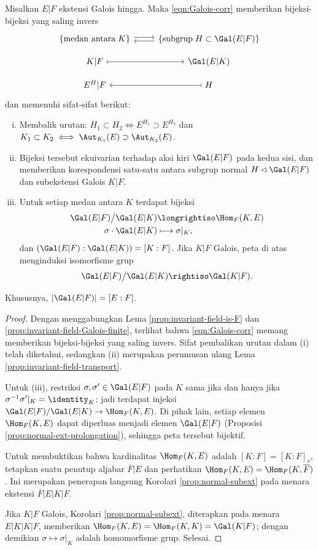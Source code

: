 \begin{theorem}\label{prop:finite-Galois-corr}
	Misalkan $E|F$ ekstensi Galois hingga. Maka \eqref{eqn:Galois-corr} memberikan bijeksi-bijeksi yang saling invers
	\[ \begin{tikzcd}[row sep=small]
	\left\{ \text{medan antara}\; K  \right\} \arrow[yshift=0.5ex, r] & \left\{\text{subgrup}\; H \subset \Gal(E|F) \right\} \arrow[yshift=-0.5ex, l] \\
		K|F \arrow[r, mapsto] & \Gal(E|K) \\
		E^H|F & H \arrow[l, mapsto]
	\end{tikzcd}\]
	dan memenuhi sifat-sifat berikut:
	\begin{enumerate}[(i)]
		\item Membalik urutan: $H_1\subset H_2\iff E^{H_1}\supset E^{H_2}$ dan $K_1\subset K_2\iff\Aut_{K_1}(E)\supset\Aut_{K_2}(E)$.
		\item Bijeksi tersebut ekuivarian terhadap aksi kiri $\Gal(E|F)$ pada kedua sisi, dan memberikan korespondensi satu-satu antara subgrup normal $H\lhd\Gal(E|F)$ dan subekstensi Galois $K|F$.
		\item Untuk setiap medan antara $K$ terdapat bijeksi
			\begin{align*}
				\Gal(E|F)\big/ \Gal(E|K) & \longrightiso \Hom_F(K, E) \\
				\sigma \cdot \Gal(E|K) & \longmapsto \sigma|_K,
			\end{align*}
			dan $(\Gal(E|F):\Gal(E|K))=[K:F]$. Jika $K|F$ Galois, peta di atas menginduksi isomorfisme grup
				\[ \Gal(E|F)\big/ \Gal(E|K) \rightiso \Gal(K|F). \]
	\end{enumerate}
	Khususnya, $|\Gal(E|F)|=[E:F]$.
\end{theorem}
\begin{proof}
	Dengan menggabungkan Lema \ref{prop:invariant-field-is-F} dan \ref{prop:invariant-field-Galois-finite}, terlihat bahwa \eqref{eqn:Galois-corr} memang memberikan bijeksi-bijeksi yang saling invers. Sifat pembalikan urutan dalam (i) telah diketahui, sedangkan (ii) merupakan perumusan ulang Lema \ref{prop:invariant-field-transport}.
	
	Untuk (iii), restriksi $\sigma,\sigma'\in\Gal(E|F)$ pada $K$ sama jika dan hanya jika $\sigma^{-1}\sigma'|_K=\identity_K$; jadi terdapat injeksi $\Gal(E|F)/\Gal(E|K)\to\Hom_F(K,E)$. Di pihak lain, setiap elemen $\Hom_F(K,E)$ dapat diperluas menjadi elemen $\Gal(E|F)$ (Proposisi \ref{prop:normal-ext-prolongation}), sehingga peta tersebut bijektif.
	
	Untuk membuktikan bahwa kardinalitas $\Hom_F(K,E)$ adalah $[K:F]=[K:F]_s$, tetapkan suatu penutup aljabar $\overline{F}|E$ dan perhatikan $\Hom_F(K,E)=\Hom_F(K,\overline{F})$. Ini merupakan penerapan langsung Korolari \ref{prop:normal-subext} pada menara ekstensi $\overline{F}|E|K|F$.

	Jika $K|F$ Galois, Korolari \ref{prop:normal-subext}, diterapkan pada menara $E|K|K|F$, memberikan $\Hom_F(K,E)=\Hom_F(K,K)=\Gal(K|F)$; dengan demikian $\sigma\mapsto\sigma|_K$ adalah homomorfisme grup. Selesai.
\end{proof}

